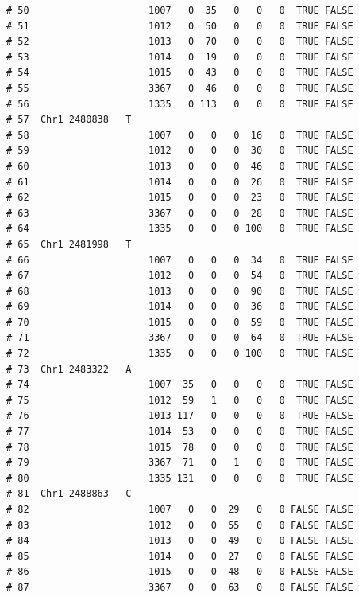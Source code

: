 \documentclass{article}\usepackage[]{graphicx}\usepackage[]{color}
\makeatletter
\newenvironment{kframe}{%
 \def\at@end@of@kframe{}%
 \ifinner\ifhmode%
  \def\at@end@of@kframe{\end{minipage}}%
  \begin{minipage}{\columnwidth}%
 \fi\fi%
 \def\FrameCommand##1{\hskip\@totalleftmargin \hskip-\fboxsep
 \colorbox{shadecolor}{##1}\hskip-\fboxsep
     \hskip-\linewidth \hskip-\@totalleftmargin \hskip\columnwidth}%
 \MakeFramed {\advance\hsize-\width
   \@totalleftmargin\z@ \linewidth\hsize
   \@setminipage}}%
 {\par\unskip\endMakeFramed%
 \at@end@of@kframe}
\newenvironment{knitrout}{}{} %
\makeatother
\begin{document}
\begin{knitrout}
\begin{kframe}
\begin{verbatim}
# 50                     1007   0  35   0   0   0  TRUE FALSE        
# 51                     1012   0  50   0   0   0  TRUE FALSE        
# 52                     1013   0  70   0   0   0  TRUE FALSE        
# 53                     1014   0  19   0   0   0  TRUE FALSE        
# 54                     1015   0  43   0   0   0  TRUE FALSE        
# 55                     3367   0  46   0   0   0  TRUE FALSE        
# 56                     1335   0 113   0   0   0  TRUE FALSE        
# 57  Chr1 2480838   T                                               
# 58                     1007   0   0   0  16   0  TRUE FALSE        
# 59                     1012   0   0   0  30   0  TRUE FALSE        
# 60                     1013   0   0   0  46   0  TRUE FALSE        
# 61                     1014   0   0   0  26   0  TRUE FALSE        
# 62                     1015   0   0   0  23   0  TRUE FALSE        
# 63                     3367   0   0   0  28   0  TRUE FALSE        
# 64                     1335   0   0   0 100   0  TRUE FALSE        
# 65  Chr1 2481998   T                                               
# 66                     1007   0   0   0  34   0  TRUE FALSE        
# 67                     1012   0   0   0  54   0  TRUE FALSE        
# 68                     1013   0   0   0  90   0  TRUE FALSE        
# 69                     1014   0   0   0  36   0  TRUE FALSE        
# 70                     1015   0   0   0  59   0  TRUE FALSE        
# 71                     3367   0   0   0  64   0  TRUE FALSE        
# 72                     1335   0   0   0 100   0  TRUE FALSE        
# 73  Chr1 2483322   A                                               
# 74                     1007  35   0   0   0   0  TRUE FALSE        
# 75                     1012  59   1   0   0   0  TRUE FALSE        
# 76                     1013 117   0   0   0   0  TRUE FALSE        
# 77                     1014  53   0   0   0   0  TRUE FALSE        
# 78                     1015  78   0   0   0   0  TRUE FALSE        
# 79                     3367  71   0   1   0   0  TRUE FALSE        
# 80                     1335 131   0   0   0   0  TRUE FALSE        
# 81  Chr1 2488863   C                                               
# 82                     1007   0   0  29   0   0 FALSE FALSE        
# 83                     1012   0   0  55   0   0 FALSE FALSE        
# 84                     1013   0   0  49   0   0 FALSE FALSE        
# 85                     1014   0   0  27   0   0 FALSE FALSE        
# 86                     1015   0   0  48   0   0 FALSE FALSE        
# 87                     3367   0   0  63   0   0 FALSE FALSE        

\end{verbatim}
\end{kframe}
\end{knitrout}
\end{document}
